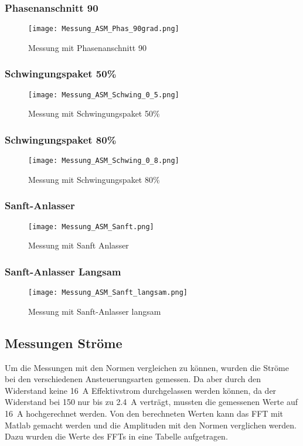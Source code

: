 \newpage
\subsubsection*{Phasenanschnitt 90\textdegree}
\begin{figure}[ht!]
	\centering
	\texttt{[image: Messung\_ASM\_Phas\_90grad.png]}	
	\caption{Messung mit Phasenanschnitt 90\textdegree}\label{fig:Mess_ASM_Phas90}
\end{figure}

\newpage
\subsubsection*{Schwingungspaket 50\%}
\begin{figure}[ht!]
	\centering
	\texttt{[image: Messung\_ASM\_Schwing\_0\_5.png]}	
	\caption{Messung mit Schwingungspaket 50\%}\label{fig:Mess_ASM_Schwing_0_5}
\end{figure}

\newpage
\subsubsection*{Schwingungspaket 80\%}
\begin{figure}[ht!]
	\centering
	\texttt{[image: Messung\_ASM\_Schwing\_0\_8.png]}	
	\caption{Messung mit Schwingungspaket 80\%}\label{fig:Mess_ASM_Schwing_0_8}
\end{figure}

\newpage
\subsubsection*{Sanft-Anlasser}
\begin{figure}[ht!]
	\centering
	\texttt{[image: Messung\_ASM\_Sanft.png]}	
	\caption{Messung mit Sanft Anlasser}\label{fig:Mess_ASM_Sanft}
\end{figure}

\newpage
\subsubsection*{Sanft-Anlasser Langsam}
\begin{figure}[ht!]
	\centering
	\texttt{[image: Messung\_ASM\_Sanft\_langsam.png]}	
	\caption{Messung mit Sanft-Anlasser langsam}\label{fig:Mess_ASM_Sanft_langsam}
\end{figure}

\newpage
\subsection{Messungen Ströme}
Um die Messungen mit den Normen vergleichen zu können, wurden die Ströme bei den verschiedenen Ansteuerungsarten gemessen. Da aber durch den Widerstand keine \SI{16}{A} Effektivstrom durchgelassen werden können, da der Widerstand bei \SI{150}{\Omega} nur bis zu \SI{2.4}{A} verträgt, mussten die gemessenen Werte auf \SI{16}{A} hochgerechnet werden.
Von den berechneten Werten kann das FFT mit Matlab gemacht werden und die Amplituden mit den Normen verglichen werden. Dazu wurden die Werte des FFTs in eine Tabelle aufgetragen.
